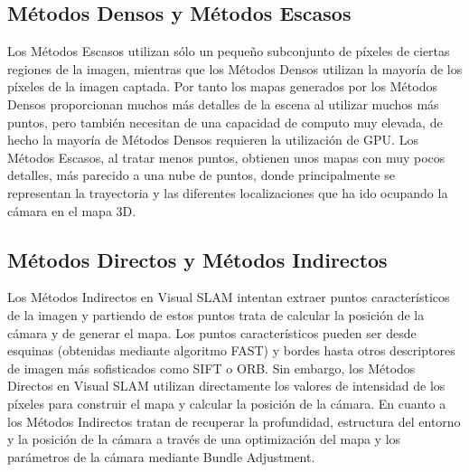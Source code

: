 \subsection{Métodos Densos y Métodos Escasos}

Los Métodos Escasos utilizan sólo un pequeño subconjunto  de píxeles de ciertas regiones de la  imagen, mientras que los Métodos Densos utilizan la mayoría de los píxeles de la imagen captada. Por tanto los mapas generados por los Métodos Densos proporcionan muchos más detalles de la escena al utilizar muchos más puntos, pero también necesitan de una capacidad de computo muy elevada, de hecho la mayoría de Métodos Densos requieren la utilización de GPU.
Los Métodos Escasos, al tratar menos puntos, obtienen unos mapas con muy pocos detalles, más parecido a una nube de puntos, donde principalmente se representan la trayectoria y las diferentes localizaciones que ha ido ocupando la cámara en el mapa 3D.

\subsection{Métodos Directos y Métodos Indirectos}

Los Métodos Indirectos en Visual SLAM intentan extraer puntos característicos de la imagen y partiendo de estos puntos trata de calcular la posición de la cámara y de generar el mapa. Los puntos característicos pueden ser desde esquinas (obtenidas mediante algoritmo FAST) y bordes hasta otros descriptores de imagen más sofisticados como SIFT o ORB. Sin embargo, los Métodos Directos en Visual SLAM utilizan directamente los valores de intensidad de los píxeles para construir el mapa y calcular la posición de la cámara. En cuanto a los Métodos Indirectos tratan de recuperar la profundidad, estructura del entorno y la posición de la cámara a través de una optimización del mapa y los parámetros de la cámara mediante Bundle Adjustment. 

